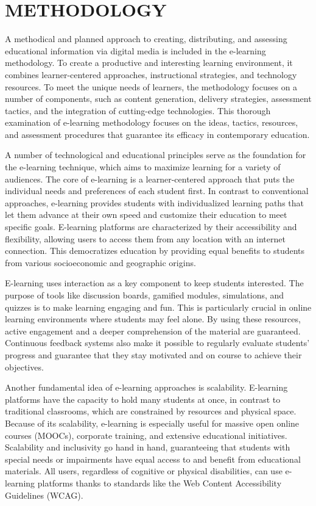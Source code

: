 \documentclass[BTech]{audiss}
\begin{document}
\section{METHODOLOGY}
A methodical and planned approach to creating, distributing, and assessing educational information via digital media is included in the e-learning methodology. To create a productive and interesting learning environment, it combines learner-centered approaches, instructional strategies, and technology resources. To meet the unique needs of learners, the methodology focuses on a number of components, such as content generation, delivery strategies, assessment tactics, and the integration of cutting-edge technologies. This thorough examination of e-learning methodology focuses on the ideas, tactics, resources, and assessment procedures that guarantee its efficacy in contemporary education.

A number of technological and educational principles serve as the foundation for the e-learning technique, which aims to maximize learning for a variety of audiences. The core of e-learning is a learner-centered approach that puts the individual needs and preferences of each student first. In contrast to conventional approaches, e-learning provides students with individualized learning paths that let them advance at their own speed and customize their education to meet specific goals. E-learning platforms are characterized by their accessibility and flexibility, allowing users to access them from any location with an internet connection. This democratizes education by providing equal benefits to students from various socioeconomic and geographic origins.

E-learning uses interaction as a key component to keep students interested. The purpose of tools like discussion boards, gamified modules, simulations, and quizzes is to make learning engaging and fun. This is particularly crucial in online learning environments where students may feel alone. By using these resources, active engagement and a deeper comprehension of the material are guaranteed. Continuous feedback systems also make it possible to regularly evaluate students' progress and guarantee that they stay motivated and on course to achieve their objectives.

Another fundamental idea of e-learning approaches is scalability. E-learning platforms have the capacity to hold many students at once, in contrast to traditional classrooms, which are constrained by resources and physical space. Because of its scalability, e-learning is especially useful for massive open online courses (MOOCs), corporate training, and extensive educational initiatives. Scalability and inclusivity go hand in hand, guaranteeing that students with special needs or impairments have equal access to and benefit from educational materials. All users, regardless of cognitive or physical disabilities, can use e-learning platforms thanks to standards like the Web Content Accessibility Guidelines (WCAG).
\end{document}
